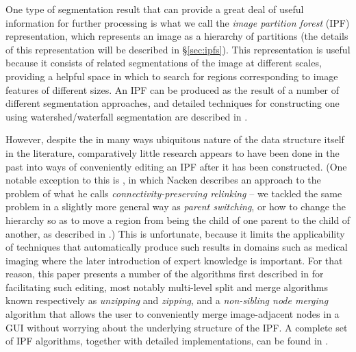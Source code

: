 \documentclass[a4paper]{article}
\begin{document}
One type of segmentation result that can provide a great deal of useful information for further processing is what we call the \emph{image partition forest} (IPF) representation\footnotemark, which represents an image as a hierarchy of partitions (the details of this representation will be described in \S\ref{sec:ipfs}). This representation is useful because it consists of related segmentations of the image at different scales, providing a helpful space in which to search for regions corresponding to image features of different sizes. An IPF can be produced as the result of a number of different segmentation approaches, and detailed techniques for constructing one using watershed/waterfall segmentation are described in \cite{golodetz11}.


However, despite the in many ways ubiquitous nature of the data structure itself in the literature, comparatively little research appears to have been done in the past into ways of conveniently editing an IPF after it has been constructed. (One notable exception to this is \cite{nacken95}, in which Nacken describes an approach to the problem of what he calls \emph{connectivity-preserving relinking} -- we tackled the same problem in a slightly more general way as \emph{parent switching}, or how to change the hierarchy so as to move a region from being the child of one parent to the child of another, as described in \cite{golodetz11}.) This is unfortunate, because it limits the applicability of techniques that automatically produce such results in domains such as medical imaging where the later introduction of expert knowledge is important. For that reason, this paper presents a number of the algorithms first described in \cite{golodetz11} for facilitating such editing, most notably multi-level split and merge algorithms known respectively as \emph{unzipping} and \emph{zipping}, and a \emph{non-sibling node merging} algorithm that allows the user to conveniently merge image-adjacent nodes in a GUI without worrying about the underlying structure of the IPF. A complete set of IPF algorithms, together with detailed implementations, can be found in \cite{golodetz11}.
\end{document}
